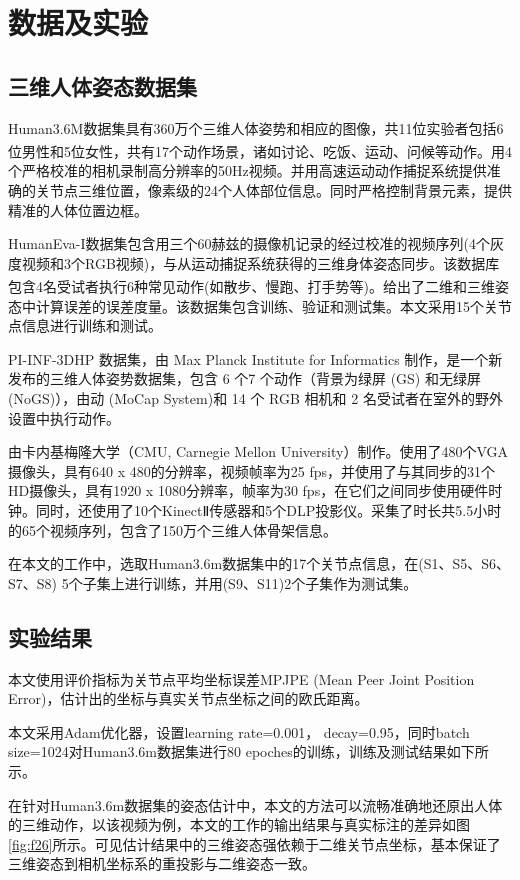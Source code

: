 \section{数据及实验}
\subsection{三维人体姿态数据集}{}
Human3.6M数据集具有360万个三维人体姿势和相应的图像，共11位实验者包括6位男性和5位女性\textsuperscript{\cite{p16}}，共有17个动作场景，诸如讨论、吃饭、运动、问候等动作。用4个严格校准的相机录制高分辨率的50Hz视频。并用高速运动动作捕捉系统提供准确的关节点三维位置，像素级的24个人体部位信息。同时严格控制背景元素，提供精准的人体位置边框。

HumanEva-I数据集包含用三个60赫兹的摄像机记录的经过校准的视频序列(4个灰度视频和3个RGB视频)，与从运动捕捉系统获得的三维身体姿态同步。该数据库包含4名受试者执行6种常见动作(如散步、慢跑、打手势等)\textsuperscript{\cite{p15}}。给出了二维和三维姿态中计算误差的误差度量。该数据集包含训练、验证和测试集。本文采用15个关节点信息进行训练和测试。

PI-INF-3DHP 数据集，由 Max Planck Institute for Informatics 制作，是一个新发布的三维人体姿势数据集，包含 6 个7 个动作（背景为绿屏 (GS) 和无绿屏 (NoGS)），由动 (MoCap System)和 14 个 RGB 相机和 2 名受试者在室外的野外设置中执行动作。

由卡内基梅隆大学（CMU, Carnegie Mellon University）制作。使用了480个VGA摄像头，具有640 x 480的分辨率，视频帧率为25 fps，并使用了与其同步的31个HD摄像头，具有1920 x 1080分辨率，帧率为30 fps，在它们之间同步使用硬件时钟。同时，还使用了10个KinectⅡ传感器和5个DLP投影仪。采集了时长共5.5小时的65个视频序列，包含了150万个三维人体骨架信息。

在本文的工作中，选取Human3.6m数据集中的17个关节点信息，在(S1、S5、S6、S7、S8) 5个子集上进行训练，并用(S9、S11)2个子集作为测试集。

\subsection{实验结果}{}
本文使用评价指标为关节点平均坐标误差MPJPE (Mean Peer Joint Position Error)，估计出的坐标与真实关节点坐标之间的欧氏距离。

本文采用Adam优化器，设置learning rate=0.001， decay=0.95，同时batch size=1024对Human3.6m数据集进行80 epoches的训练，训练及测试结果如下所示。

在针对Human3.6m数据集的姿态估计中，本文的方法可以流畅准确地还原出人体的三维动作，以该视频为例，本文的工作的输出结果与真实标注的差异如图\ref{fig:f26}所示。可见估计结果中的三维姿态强依赖于二维关节点坐标，基本保证了三维姿态到相机坐标系的重投影与二维姿态一致。

